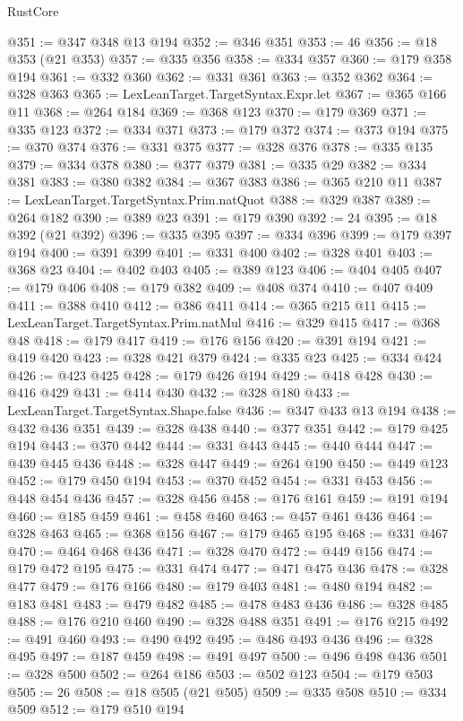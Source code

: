 \begin{lexlean}{RustCore}
\begin{coremodule}
@351 := @347 @348 @13 @194
@352 := @346 @351
@353 := 46
@356 := @18 @353 (@21 @353)
@357 := @335 @356
@358 := @334 @357
@360 := @179 @358 @194
@361 := @332 @360
@362 := @331 @361
@363 := @352 @362
@364 := @328 @363
@365 := LexLeanTarget.TargetSyntax.Expr.let
@367 := @365 @166 @11
@368 := @264 @184
@369 := @368 @123
@370 := @179 @369
@371 := @335 @123
@372 := @334 @371
@373 := @179 @372
@374 := @373 @194
@375 := @370 @374
@376 := @331 @375
@377 := @328 @376
@378 := @335 @135
@379 := @334 @378
@380 := @377 @379
@381 := @335 @29
@382 := @334 @381
@383 := @380 @382
@384 := @367 @383
@386 := @365 @210 @11
@387 := LexLeanTarget.TargetSyntax.Prim.natQuot
@388 := @329 @387
@389 := @264 @182
@390 := @389 @23
@391 := @179 @390
@392 := 24
@395 := @18 @392 (@21 @392)
@396 := @335 @395
@397 := @334 @396
@399 := @179 @397 @194
@400 := @391 @399
@401 := @331 @400
@402 := @328 @401
@403 := @368 @23
@404 := @402 @403
@405 := @389 @123
@406 := @404 @405
@407 := @179 @406
@408 := @179 @382
@409 := @408 @374
@410 := @407 @409
@411 := @388 @410
@412 := @386 @411
@414 := @365 @215 @11
@415 := LexLeanTarget.TargetSyntax.Prim.natMul
@416 := @329 @415
@417 := @368 @48
@418 := @179 @417
@419 := @176 @156
@420 := @391 @194
@421 := @419 @420
@423 := @328 @421 @379
@424 := @335 @23
@425 := @334 @424
@426 := @423 @425
@428 := @179 @426 @194
@429 := @418 @428
@430 := @416 @429
@431 := @414 @430
@432 := @328 @180
@433 := LexLeanTarget.TargetSyntax.Shape.false
@436 := @347 @433 @13 @194
@438 := @432 @436 @351
@439 := @328 @438
@440 := @377 @351
@442 := @179 @425 @194
@443 := @370 @442
@444 := @331 @443
@445 := @440 @444
@447 := @439 @445 @436
@448 := @328 @447
@449 := @264 @190
@450 := @449 @123
@452 := @179 @450 @194
@453 := @370 @452
@454 := @331 @453
@456 := @448 @454 @436
@457 := @328 @456
@458 := @176 @161
@459 := @191 @194
@460 := @185 @459
@461 := @458 @460
@463 := @457 @461 @436
@464 := @328 @463
@465 := @368 @156
@467 := @179 @465 @195
@468 := @331 @467
@470 := @464 @468 @436
@471 := @328 @470
@472 := @449 @156
@474 := @179 @472 @195
@475 := @331 @474
@477 := @471 @475 @436
@478 := @328 @477
@479 := @176 @166
@480 := @179 @403
@481 := @480 @194
@482 := @183 @481
@483 := @479 @482
@485 := @478 @483 @436
@486 := @328 @485
@488 := @176 @210 @460
@490 := @328 @488 @351
@491 := @176 @215
@492 := @491 @460
@493 := @490 @492
@495 := @486 @493 @436
@496 := @328 @495
@497 := @187 @459
@498 := @491 @497
@500 := @496 @498 @436
@501 := @328 @500
@502 := @264 @186
@503 := @502 @123
@504 := @179 @503
@505 := 26
@508 := @18 @505 (@21 @505)
@509 := @335 @508
@510 := @334 @509
@512 := @179 @510 @194

\end{coremodule}
\end{lexlean}
